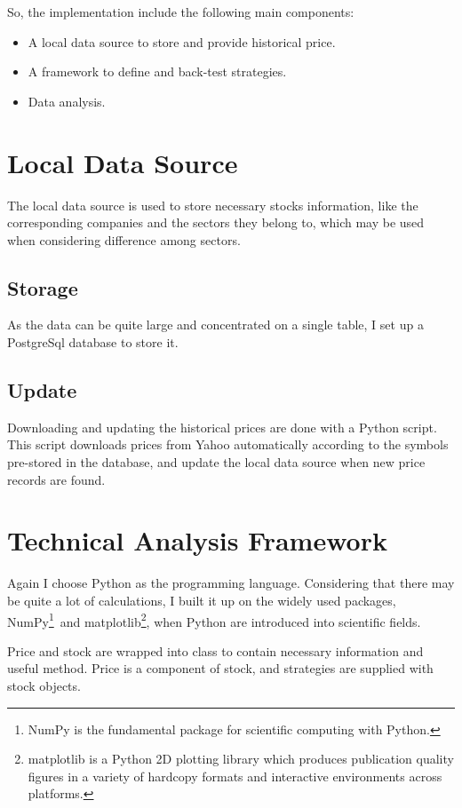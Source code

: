 \documentclass[12pt,a4paper]{article}
\begin{document}
So, the implementation include the following main components:
\begin{itemize}[itemsep=0pt]
\item A local data source to store and provide historical price.
\item A framework to define and back-test strategies.
\item Data analysis.
\end{itemize}


\section{Local Data Source}
The local data source is used to store necessary stocks information, 
like the corresponding companies and the sectors they belong to, 
which may be used when considering difference among sectors.

\subsection{Storage}
As the data can be quite large and concentrated on a single table,
I set up a PostgreSql database to store it.

\subsection{Update}
Downloading and updating the historical prices are done 
with a Python script.
This script downloads prices from Yahoo automatically 
according to the symbols pre-stored in the database, 
and update the local data source when new price records are found.


\section{Technical Analysis Framework}
Again I choose Python as the programming language. Considering that 
there may be quite a lot of calculations, 
I built it up on the widely used packages, 
NumPy\footnote{NumPy is the fundamental package 
for scientific computing with Python.}~and 
matplotlib\footnote{matplotlib is a Python 2D plotting library 
which produces publication quality figures in a variety of hardcopy 
formats and interactive environments across platforms.}, 
when Python are introduced into scientific fields.

Price and stock are wrapped into class to contain necessary information
and useful method. Price is a component of stock, and strategies are 
supplied with stock objects.
\end{document}
